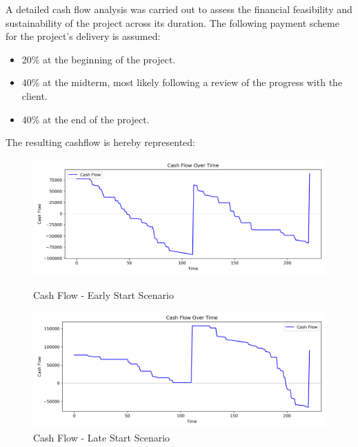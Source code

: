 \documentclass[12pt]{article}
\begin{document}
A detailed cash flow analysis was carried out to assess the financial feasibility and sustainability of the project across its duration. The following payment scheme for the project's delivery is assumed:
\begin{itemize}
        \item 20\% at the beginning of the project.
        \item 40\% at the midterm, most likely following a review of the progress with the client.
        \item 40\% at the end of the project.
\end{itemize}

The resulting cashflow is hereby represented:

\begin{figure}[H]
        \centering
        \begin{minipage}{0.48\textwidth}
                \centering
                \includegraphics[width=\textwidth]{../cash_flow_E.png}
                \caption{Cash Flow - Early Start Scenario}
                \label{fig:cashflow_early}
        \end{minipage}\hfill
        \begin{minipage}{0.48\textwidth}
                \centering
                \includegraphics[width=\textwidth]{../cash_flow_L.png}
                \caption{Cash Flow - Late Start Scenario}
                \label{fig:cashflow_late}
        \end{minipage}
\end{figure}
\end{document}
